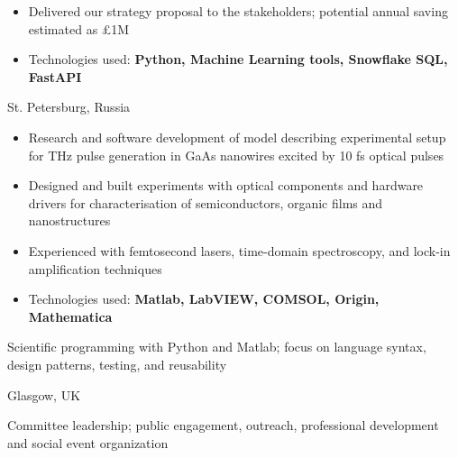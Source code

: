 \documentclass[10pt,a4paper,ragged2e,withhyper]{altacv}
\begin{document}
\begin{paracol}{2}
\begin{itemize}
    \item Delivered our strategy proposal to the stakeholders; 
    potential annual saving estimated as £1M

    \item Technologies used: 
    {\bf Python, Machine Learning tools, Snowflake SQL, FastAPI}
\end{itemize}

\divider

{St. Petersburg, Russia}

\begin{itemize}
    \item Research and software development of model describing experimental
    setup for THz pulse generation in GaAs nanowires excited by 10 fs
    optical pulses

    \item Designed and built experiments with optical components and hardware
    drivers for characterisation of semiconductors, organic films and
    nanostructures
    
    \item Experienced with femtosecond lasers, time-domain spectroscopy, and
    lock-in amplification techniques

    \item Technologies used:
    {\bf Matlab, LabVIEW, COMSOL, Origin, Mathematica}
\end{itemize}



Scientific programming with Python and Matlab;
focus on language syntax, design patterns, testing, and reusability

\divider

{Glasgow, UK}

Committee leadership;
public engagement, outreach, professional development and social event
organization



\end{paracol}
\end{document}
